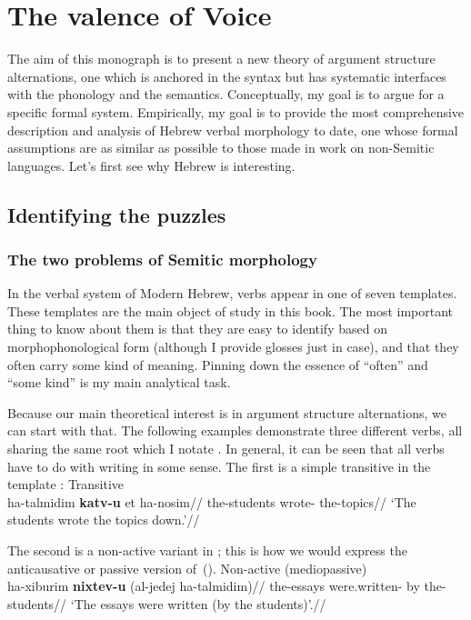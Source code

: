 \chapter{The valence of Voice}
\label{chap:intro}

The aim of this monograph is to present a new theory of argument structure alternations, one which is anchored in the syntax but has systematic interfaces with the phonology and the semantics. Conceptually, my goal is to argue for a specific formal system. Empirically, my goal is to provide the most comprehensive description and analysis of Hebrew verbal morphology to date, one whose formal assumptions are as similar as possible to those made in work on non-Semitic languages. Let's first see why Hebrew is interesting.

\section{Identifying the puzzles}
	\subsection{The two problems of Semitic morphology}
In the verbal system of Modern Hebrew, verbs appear in one of seven templates. These templates are the main object of study in this book. The most important thing to know about them is that they are easy to identify based on morphophonological form (although I provide glosses just in case), and that they often carry some kind of meaning. Pinning down the essence of ``often'' and ``some kind'' is my main analytical task.

Because our main theoretical interest is in argument structure alternations, we can start with that. The following examples demonstrate three different verbs, all sharing the same root which I notate . In general, it can be seen that all verbs have to do with writing in some sense. The first is a simple transitive in the template {\tkal}:
\ex	\label{ex:intro-tkal}Transitive {\tkal}\\
		\begingl
		\gla ha-talmidim \textbf{katv-u} et ha-nosim//
		\glb the-students wrote-  the-topics//
		\glft `The students wrote the topics down.'//
	\endgl
\xe

The second is a non-active variant in {\tnif}; this is how we would express the anticausative or passive version of~(\lastx).
\ex \label{ex:intro-tnif}Non-active (mediopassive) {\tnif}\\
		\begingl
		\gla ha-xiburim \textbf{nixtev-u} (al-jedej ha-talmidim)//
		\glb the-essays were.written- by the-students//
		\glft `The essays were written (by the students)'.//
	\endgl
\xe

